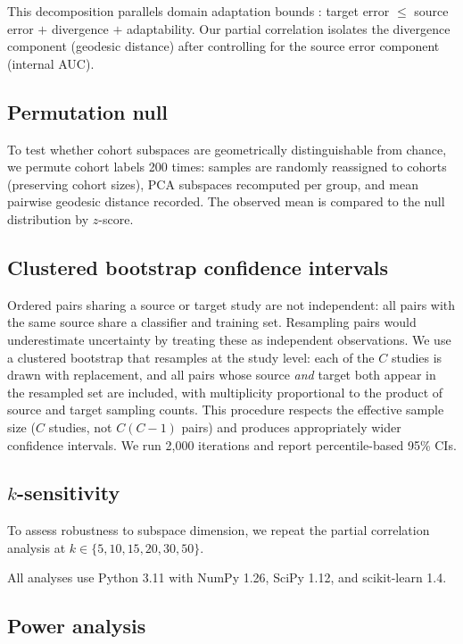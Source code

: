 \documentclass{article}
\begin{document}
This decomposition parallels domain adaptation bounds \citep{bendavid2010theory, mansour2009domain}: target error $\leq$ source error $+$ divergence $+$ adaptability. Our partial correlation isolates the divergence component (geodesic distance) after controlling for the source error component (internal AUC).

\subsection{Permutation null}

To test whether cohort subspaces are geometrically distinguishable from chance, we permute cohort labels 200 times: samples are randomly reassigned to cohorts (preserving cohort sizes), PCA subspaces recomputed per group, and mean pairwise geodesic distance recorded. The observed mean is compared to the null distribution by $z$-score.

\subsection{Clustered bootstrap confidence intervals}

Ordered pairs sharing a source or target study are not independent: all pairs with the same source share a classifier and training set. Resampling pairs would underestimate uncertainty by treating these as independent observations. We use a clustered bootstrap that resamples at the study level: each of the $C$ studies is drawn with replacement, and all pairs whose source \emph{and} target both appear in the resampled set are included, with multiplicity proportional to the product of source and target sampling counts. This procedure respects the effective sample size ($C$ studies, not $C(C-1)$ pairs) and produces appropriately wider confidence intervals. We run 2{,}000 iterations and report percentile-based 95\% CIs.

\subsection{$k$-sensitivity}

To assess robustness to subspace dimension, we repeat the partial correlation analysis at $k \in \{5, 10, 15, 20, 30, 50\}$.

All analyses use Python 3.11 with NumPy 1.26, SciPy 1.12, and scikit-learn 1.4.

\subsection{Power analysis}
\label{sec:power}
\end{document}
